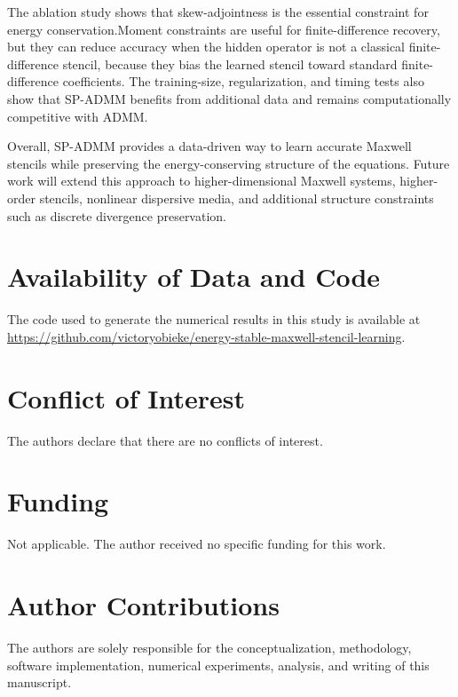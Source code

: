 \documentclass[11pt]{article}
\numberwithin{equation}{section}
\numberwithin{figure}{section}
\numberwithin{table}{section}
\begin{document}
The ablation study shows that skew-adjointness is the essential constraint
for energy conservation.Moment constraints are useful for finite-difference recovery, but they can reduce accuracy when the hidden operator is not a classical finite-difference stencil, because they bias the learned stencil toward standard finite-difference coefficients. The training-size, regularization, and timing tests also
show that SP-ADMM benefits from additional data and remains computationally
competitive with ADMM.

Overall, SP-ADMM provides a data-driven way to learn accurate Maxwell
stencils while preserving the energy-conserving structure of the equations.
Future work will extend this approach to higher-dimensional Maxwell systems,
higher-order stencils, nonlinear dispersive media, and additional structure
constraints such as discrete divergence preservation.

\section*{Availability of Data and Code}
The code used to generate the numerical results in this study is
available at
\url{https://github.com/victoryobieke/energy-stable-maxwell-stencil-learning}.
\section*{Conflict of Interest}
The authors declare that there are no conflicts of interest.

\section*{Funding}
Not applicable. The author received no specific funding for this work.

\section*{Author Contributions}
The authors are solely responsible for the conceptualization, methodology, software implementation, numerical experiments, analysis, and writing of this manuscript.


\end{document}

